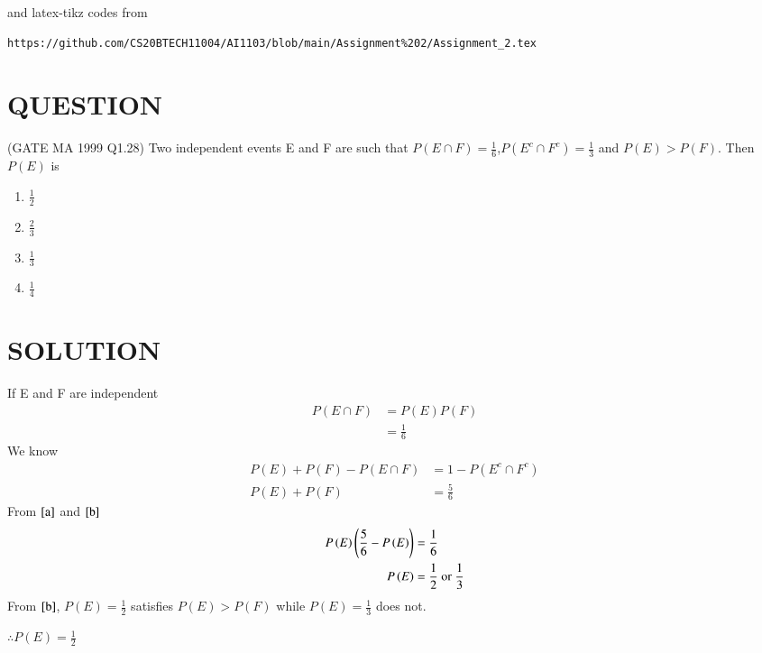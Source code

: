\documentclass[journal,12pt,twocolumn]{IEEEtran}
\begin{document}
\providecommand{\p}[1]{\ensuremath{P\left(#1\right)}}

and latex-tikz codes from 
%
\begin{lstlisting}
https://github.com/CS20BTECH11004/AI1103/blob/main/Assignment%202/Assignment_2.tex
\end{lstlisting}
\section{QUESTION} 
(GATE MA 1999 Q1.28) Two independent events E and F are such that $\p{E\cap F} = \displaystyle\frac{1}{6}$,$\p{E^c\cap F^c}=\displaystyle\frac{1}{3}$ and $\p{E}>\p{F}$. Then $\p{E}$ is
\begin{enumerate}[label=(\Alph*)]
    \item $\displaystyle\frac{1}{2}$\\
    \item $\displaystyle\frac{2}{3}$\\
    \item $\displaystyle\frac{1}{3}$\\
    \item $\displaystyle\frac{1}{4}$
\end{enumerate}
\section{SOLUTION}
If E and F are independent
\begin{align}
    \p{E\cap F}&=\p{E}\p{F}\nonumber\\
                &=\frac{1}{6}\label{a}
\end{align}
We know
\begin{align}
    \p{E}+\p{F}-\p{E\cap F}&=1-\p{E^c\cap F^c}\nonumber\\
    \p{E}+\p{F}&=\frac{5}{6}\label{b}
\end{align}
From $\eqref{a}$ and $\eqref{b}$
\begin{align}
    \p{E}\brak{\frac{5}{6}-\p{E}}&=\frac{1}{6}\\
    \p{E}&=\frac{1}{2} \text{ or } \frac{1}{3}
\end{align}
From $\eqref{b}$, $\p{E}=\frac{1}{2}$ satisfies $\p{E}>\p{F}$ while  $\p{E}=\frac{1}{3}$ does not.

$\therefore \p{E}=\frac{1}{2}$

\end{document}
